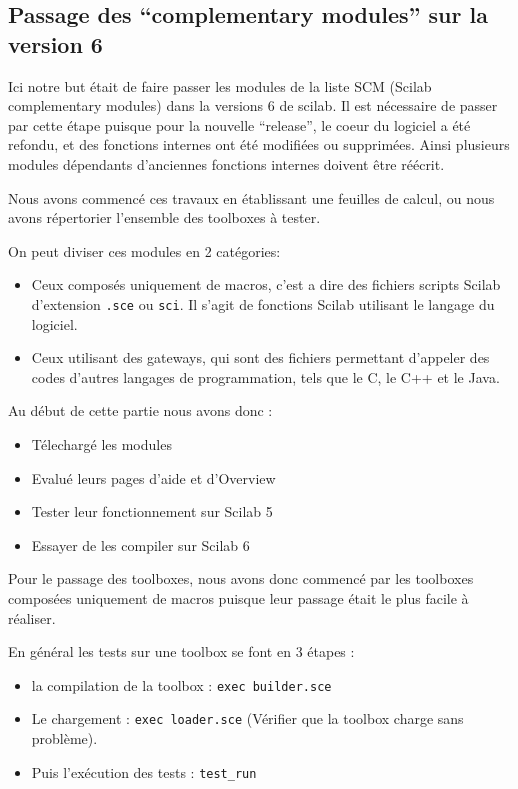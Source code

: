 \subsection*{Passage des ``complementary modules'' sur la version 6}

Ici notre but était de faire passer les modules de la liste
SCM (Scilab complementary modules) dans la versions 6 de scilab.
Il est nécessaire de passer par cette étape puisque pour la
nouvelle ``release'', le coeur du logiciel a été refondu,
et des fonctions internes ont été modifiées ou supprimées.
Ainsi plusieurs modules dépendants d’anciennes fonctions internes
doivent être réécrit.

Nous avons commencé ces travaux en établissant une feuilles de calcul,
ou nous avons répertorier l’ensemble des toolboxes à tester.

On peut diviser ces modules en 2 catégories:

\begin{itemize}
    \item Ceux composés uniquement de macros, c’est a dire
        des fichiers scripts Scilab d’extension {\tt .sce}
        ou {\tt sci}.
        Il s’agit de fonctions Scilab utilisant le langage du logiciel.
    \item Ceux utilisant des gateways, qui sont des fichiers
        permettant d’appeler des codes d’autres langages de
        programmation, tels que le C, le C++ et le Java.
\end{itemize}

Au début de cette partie nous avons donc :

\begin{itemize}
\item Télechargé les modules
\item Evalué leurs pages d’aide et d’Overview
\item Tester leur fonctionnement sur Scilab 5
\item Essayer de les compiler sur Scilab 6
\end{itemize}

Pour le passage des toolboxes, nous avons donc commencé par
les toolboxes composées uniquement de macros puisque leur
passage était le plus facile à réaliser.

En général les tests sur une toolbox se font en 3 étapes :

\begin{itemize}
    \item la compilation de la toolbox : {\tt exec builder.sce}
    \item Le chargement : {\tt exec loader.sce}
        (V\'erifier que la toolbox charge sans probl\`eme).
    \item Puis l'exécution des tests : {\tt test\_run}
\end{itemize}

